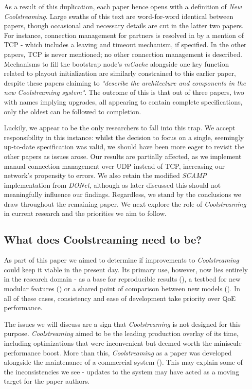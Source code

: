\documentclass[12pt,a4paper]{article}
\begin{document}
As a result of this duplication, each paper hence opens with a definition of \textit{New Coolstreaming}. Large swaths of this text are word-for-word identical between papers, though occasional and necessary details are cut in the latter two papers. For instance, connection management for partners is resolved in \cite{Xie2007} by a mention of TCP - which includes a leaving and timeout mechanism, if specified. In the other papers, TCP is never mentioned; no other connection management is described. Mechanisms to fill the bootstrap node's \textit{mCache} alongside one key function related to playout initialization are similarly constrained to this earlier paper, despite these papers claiming to \textit{"describe the architecture and components in the new Coolstreaming system"}. The outcome of this is that out of three papers, two with names implying upgrades, all appearing to contain complete specifications, only the oldest can be followed to completion.

Luckily, we appear to be the only researchers to fall into this trap. We accept responsibility in this instance: whilst the decision to focus on a single, seemingly up-to-date specification was valid, we should have been more eager to revisit the other papers as issues arose. Our results are partially affected, as we implement manual connection management over UDP instead of TCP, increasing our network's propensity to errors. We also retain the modified \textit{SCAMP} implementation from \textit{DONet}, although as later discussed this should not meaningfully influence our findings. Regardless, we stand by the conclusions we draw throughout the remaining paper. We next explore the role of \textit{Coolstreaming} in current research and the priorities we aim to follow.

\subsection{What does Coolstreaming need to be?} \label{problems:what}
As part of this paper we aimed to determine if improvements to \textit{Coolstreaming} could keep it viable in the present day. Its primary use, however, now lies entirely in the research domain - as a base for reproducible results (\cite{Liu2010}), a testbed for new modular features (\cite{Ho2014}) or a shared point of comparison between new models (\cite{Pal2017}). In all of these cases, consistency and ease of development take priority over QoE performance.

The issues we will discuss are a sign that \textit{Coolstreaming} is not designed for this purpose. \textit{Coolstreaming} aimed to be the leading production overlay of its time, including optimizations that were inconvenient but deemed worth the miniscule performance boost. More than this, \textit{Coolstreaming} as a paper was developed alongside the maintenance of a commercial system (\cite{Li2007}). This may explain some of the inconsistencies we see - updates to the system may have acted as a moving target for the paper authors.
\end{document}
